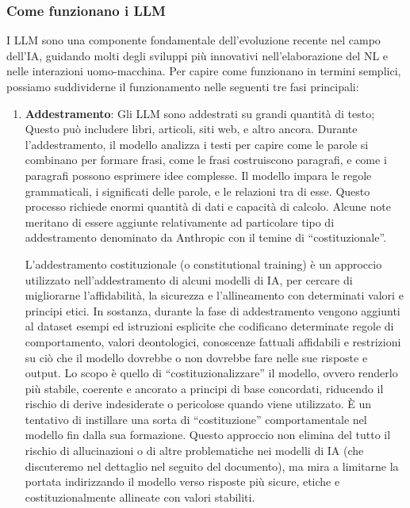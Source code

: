         \subsubsection{Come funzionano i LLM}
            I LLM sono una componente fondamentale dell'evoluzione recente nel campo dell'IA, guidando molti degli sviluppi più innovativi nell'elaborazione del NL e nelle interazioni uomo-macchina. Per capire come funzionano in termini semplici, possiamo suddividerne il funzionamento nelle seguenti tre fasi principali:
            \begin{enumerate}
                \item
                    \textbf{Addestramento}: Gli LLM sono addestrati su grandi quantità di testo; Questo può includere libri, articoli, siti web, e altro ancora. Durante l'addestramento, il modello analizza i testi per capire come le parole si combinano per formare frasi, come le frasi costruiscono paragrafi, e come i paragrafi possono esprimere idee complesse. Il modello impara le regole grammaticali, i significati delle parole, e le relazioni tra di esse. Questo processo richiede enormi quantità di dati e capacità di calcolo. Alcune note meritano di essere aggiunte relativamente ad particolare tipo di addestramento denominato da Anthropic con il temine di ``costituzionale''.
            
                    L'addestramento costituzionale (o constitutional training) è un approccio utilizzato nell'addestramento di alcuni modelli di IA, per cercare di migliorarne l'affidabilità, la sicurezza e l'allineamento con determinati valori e principi etici. In sostanza, durante la fase di addestramento vengono aggiunti al dataset esempi ed istruzioni esplicite che codificano determinate regole di comportamento, valori deontologici, conoscenze fattuali affidabili e restrizioni su ciò che il modello dovrebbe o non dovrebbe fare nelle sue risposte e output. Lo scopo è quello di ``costituzionalizzare'' il modello, ovvero renderlo più stabile, coerente e ancorato a principi di base concordati, riducendo il rischio di derive indesiderate o pericolose quando viene utilizzato. È un tentativo di instillare una sorta di ``costituzione'' comportamentale nel modello fin dalla sua formazione. Questo approccio non elimina del tutto il rischio di allucinazioni o di altre problematiche nei modelli di IA (che discuteremo nel dettaglio nel seguito del documento), ma mira a limitarne la portata indirizzando il modello verso risposte più sicure, etiche e costituzionalmente allineate con valori stabiliti.


\end{enumerate}
